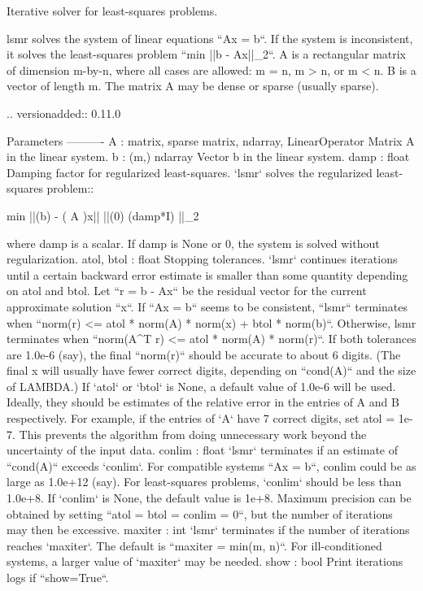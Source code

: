 \begin{DoxyVerb}Iterative solver for least-squares problems.

lsmr solves the system of linear equations ``Ax = b``. If the system
is inconsistent, it solves the least-squares problem ``min ||b - Ax||_2``.
A is a rectangular matrix of dimension m-by-n, where all cases are
allowed: m = n, m > n, or m < n. B is a vector of length m.
The matrix A may be dense or sparse (usually sparse).

.. versionadded:: 0.11.0

Parameters
----------
A : {matrix, sparse matrix, ndarray, LinearOperator}
    Matrix A in the linear system.
b : (m,) ndarray
    Vector b in the linear system.
damp : float
    Damping factor for regularized least-squares. `lsmr` solves
    the regularized least-squares problem::

     min ||(b) - (  A   )x||
         ||(0)   (damp*I) ||_2

    where damp is a scalar.  If damp is None or 0, the system
    is solved without regularization.
atol, btol : float
    Stopping tolerances. `lsmr` continues iterations until a
    certain backward error estimate is smaller than some quantity
    depending on atol and btol.  Let ``r = b - Ax`` be the
    residual vector for the current approximate solution ``x``.
    If ``Ax = b`` seems to be consistent, ``lsmr`` terminates
    when ``norm(r) <= atol * norm(A) * norm(x) + btol * norm(b)``.
    Otherwise, lsmr terminates when ``norm(A^{T} r) <=
    atol * norm(A) * norm(r)``.  If both tolerances are 1.0e-6 (say),
    the final ``norm(r)`` should be accurate to about 6
    digits. (The final x will usually have fewer correct digits,
    depending on ``cond(A)`` and the size of LAMBDA.)  If `atol`
    or `btol` is None, a default value of 1.0e-6 will be used.
    Ideally, they should be estimates of the relative error in the
    entries of A and B respectively.  For example, if the entries
    of `A` have 7 correct digits, set atol = 1e-7. This prevents
    the algorithm from doing unnecessary work beyond the
    uncertainty of the input data.
conlim : float
    `lsmr` terminates if an estimate of ``cond(A)`` exceeds
    `conlim`.  For compatible systems ``Ax = b``, conlim could be
    as large as 1.0e+12 (say).  For least-squares problems,
    `conlim` should be less than 1.0e+8. If `conlim` is None, the
    default value is 1e+8.  Maximum precision can be obtained by
    setting ``atol = btol = conlim = 0``, but the number of
    iterations may then be excessive.
maxiter : int
    `lsmr` terminates if the number of iterations reaches
    `maxiter`.  The default is ``maxiter = min(m, n)``.  For
    ill-conditioned systems, a larger value of `maxiter` may be
    needed.
show : bool
    Print iterations logs if ``show=True``.


\end{DoxyVerb}
